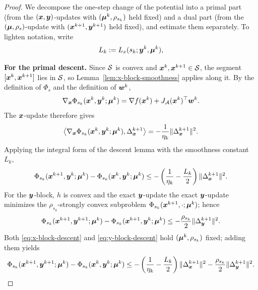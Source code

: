 \begin{proof}
We decompose the one-step change of the potential into a primal part
(from the $(\bm{x},\bm{y})$-updates with $(\bm{\mu}^k,\rho_{s_k})$ held fixed) and
a dual part (from the $(\bm{\mu},\rho_s)$-update with
$(\bm{x}^{k+1},\bm{y}^{k+1})$ held fixed), and estimate them separately.
To lighten notation, write
\[
    L_k:=L_x(s_k;\bm{y}^k,\bm{\mu}^k),
\]

\textbf{For the primal descent.}
Since $\mathcal{S}$ is convex and $\bm{x}^k,\bm{x}^{k+1}\in\mathcal{S}$, the segment
$[\bm{x}^k,\bm{x}^{k+1}]$ lies in $\mathcal{S}$, so
Lemma~\ref{lem:x-block-smoothness} applies along it.
By the definition of $\Phi_s$ and the definition of $\bm{w}^k$,
\[
    \nabla_{\bm{x}}\Phi_{s_k}(\bm{x}^k,\bm{y}^k;\bm{\mu}^k)
    =
    \nabla f(\bm{x}^k)+J_{\mathcal{A}}(\bm{x}^k)^\top\bm{w}^k.
\]
The $\bm{x}$-update therefore gives
\[
    \bigl\langle\nabla_{\bm{x}}\Phi_{s_k}(\bm{x}^k,\bm{y}^k;\bm{\mu}^k),
              \Delta_{\bm{x}}^{k+1}\bigr\rangle
    =
    -\frac{1}{\eta_k}\|\Delta_{\bm{x}}^{k+1}\|^2.
\]
Applying the integral form of the descent lemma with the smoothness
constant $L_k$,
\begin{equation}
    \Phi_{s_k}(\bm{x}^{k+1},\bm{y}^k;\bm{\mu}^k)
    -\Phi_{s_k}(\bm{x}^k,\bm{y}^k;\bm{\mu}^k)
    \le
    -\left(\frac{1}{\eta_k}-\frac{L_k}{2}\right)
    \|\Delta_{\bm{x}}^{k+1}\|^2.
    \label{eq:x-block-descent}
\end{equation}
For the $\bm{y}$-block, $h$ is convex and the exact $\bm{y}$-update
the exact $\bm{y}$-update minimizes the $\rho_{s_k}$-strongly convex
subproblem $\Phi_{s_k}(\bm{x}^{k+1},\cdot;\bm{\mu}^k)$; hence
\begin{equation}
    \Phi_{s_k}(\bm{x}^{k+1},\bm{y}^{k+1};\bm{\mu}^k)
    -\Phi_{s_k}(\bm{x}^{k+1},\bm{y}^k;\bm{\mu}^k)
    \le
    -\frac{\rho_{s_k}}{2}\|\Delta_{\bm{y}}^{k+1}\|^2.
    \label{eq:y-block-descent}
\end{equation}
Both \eqref{eq:x-block-descent} and \eqref{eq:y-block-descent} hold
$(\bm{\mu}^k,\rho_{s_k})$ fixed; adding them yields
\begin{equation}
    \Phi_{s_k}(\bm{x}^{k+1},\bm{y}^{k+1};\bm{\mu}^k)
    -\Phi_{s_k}(\bm{x}^k,\bm{y}^k;\bm{\mu}^k)
    \le
    -\left(\frac{1}{\eta_k}-\frac{L_k}{2}\right)
    \|\Delta_{\bm{x}}^{k+1}\|^2
    -\frac{\rho_{s_k}}{2}\|\Delta_{\bm{y}}^{k+1}\|^2.
    \label{eq:primal-descent}
\end{equation}


\end{proof}
